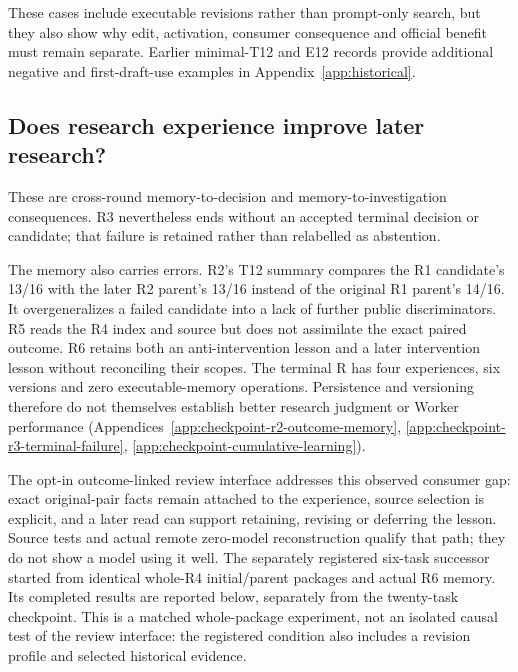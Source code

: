 These cases include executable revisions rather than prompt-only search, but
they also show why edit, activation, consumer consequence and official benefit
must remain separate. Earlier minimal-T12 and E12 records provide additional
negative and first-draft-use examples in Appendix~\ref{app:historical}.

\subsection{Does research experience improve later research?}

 These are cross-round memory-to-decision and memory-to-investigation
consequences. R3 nevertheless ends without an accepted terminal decision or
candidate; that failure is retained rather than relabelled as abstention.

The memory also carries errors. R2's T12 summary compares the R1 candidate's
13/16 with the later R2 parent's 13/16 instead of the original R1 parent's
14/16. It overgeneralizes a failed candidate into a lack of further public
discriminators. R5 reads the R4 index and source but does not assimilate the
exact paired outcome. R6 retains both an anti-intervention lesson and a later
intervention lesson without reconciling their scopes. The terminal R has four
experiences, six versions and zero executable-memory operations.
Persistence and versioning therefore do not themselves establish better
research judgment or Worker performance
(Appendices~\ref{app:checkpoint-r2-outcome-memory},
\ref{app:checkpoint-r3-terminal-failure},
\ref{app:checkpoint-cumulative-learning}).

The opt-in outcome-linked review interface addresses this observed consumer
gap: exact original-pair facts remain attached to the experience, source
selection is explicit, and a later read can support retaining, revising or
deferring the lesson. Source tests and actual remote zero-model reconstruction
qualify that path; they do not show a model using it well. The separately
registered six-task successor started from identical whole-R4 initial/parent
packages and actual R6 memory. Its completed results are reported below,
separately from the twenty-task checkpoint. This is a matched whole-package experiment,
not an isolated causal test of the review interface: the registered condition
also includes a revision profile and selected historical evidence.

